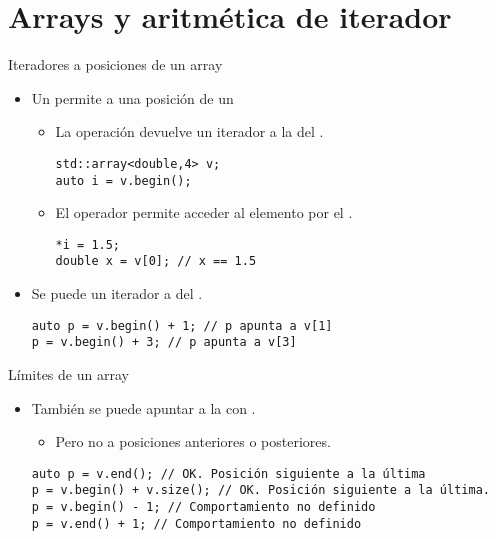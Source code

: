 \section{Arrays y aritmética de iterador}

\begin{frame}[t,fragile]{Iteradores a posiciones de un array}
\begin{itemize}
  \item Un  permite  
        a una posición de un 
    \begin{itemize}
      \item La operación  devuelve un iterador a la 
             del .
\begin{lstlisting}
std::array<double,4> v;
auto i = v.begin();
\end{lstlisting}

      \item El operador \cppkey{*} permite acceder al 
            elemento  por el .
\begin{lstlisting}
*i = 1.5;
double x = v[0]; // x == 1.5
\end{lstlisting}
    \end{itemize}

  \item Se puede  un iterador a  del 
        .
\begin{lstlisting}
auto p = v.begin() + 1; // p apunta a v[1]
p = v.begin() + 3; // p apunta a v[3]
\end{lstlisting}
\end{itemize}
\end{frame}

\begin{frame}[t,fragile]{Límites de un array}
\begin{itemize}
  \item También se puede apuntar a la 
        con .
    \begin{itemize}
      \item Pero no a posiciones anteriores o posteriores.
    \end{itemize}
\begin{lstlisting}
auto p = v.end(); // OK. Posición siguiente a la última
p = v.begin() + v.size(); // OK. Posición siguiente a la última.
p = v.begin() - 1; // Comportamiento no definido
p = v.end() + 1; // Comportamiento no definido
\end{lstlisting}
\end{itemize}
\end{frame}

